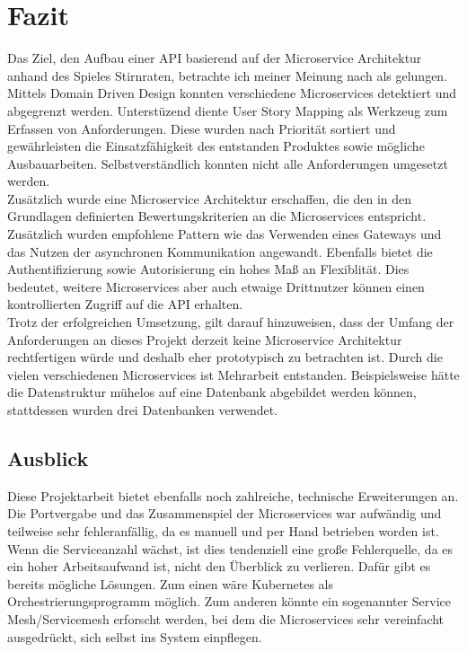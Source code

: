 \section{Fazit}

Das Ziel, den Aufbau einer API basierend auf der Microservice Architektur anhand des Spieles Stirnraten, betrachte ich meiner Meinung nach als gelungen. Mittels Domain Driven Design konnten verschiedene Microservices detektiert und abgegrenzt werden. Unterstüzend diente User Story Mapping als Werkzeug zum Erfassen von Anforderungen. Diese wurden nach Priorität sortiert und gewährleisten die Einsatzfähigkeit des entstanden Produktes sowie mögliche Ausbauarbeiten. Selbstverständlich konnten nicht alle Anforderungen umgesetzt werden. \\

Zusätzlich wurde eine Microservice Architektur erschaffen, die den in den Grundlagen definierten Bewertungskriterien an die Microservices entspricht. Zusätzlich wurden empfohlene Pattern wie das Verwenden eines Gateways und das Nutzen der asynchronen Kommunikation angewandt. Ebenfalls bietet die Authentifizierung sowie Autorisierung ein hohes Maß an Flexiblität. Dies bedeutet, weitere Microservices aber auch etwaige Drittnutzer können einen kontrollierten Zugriff auf die API erhalten.\\

Trotz der erfolgreichen Umsetzung, gilt darauf hinzuweisen, dass der Umfang der Anforderungen an dieses Projekt derzeit keine Microservice Architektur rechtfertigen würde und deshalb eher prototypisch zu betrachten ist. Durch die vielen verschiedenen Microservices ist Mehrarbeit entstanden. Beispielsweise hätte die Datenstruktur mühelos auf eine Datenbank abgebildet werden können, stattdessen wurden drei Datenbanken verwendet. 

\subsection{Ausblick}
Diese Projektarbeit bietet ebenfalls noch zahlreiche, technische Erweiterungen an. Die Portvergabe und das Zusammenspiel der Microservices war aufwändig und teilweise sehr fehleranfällig, da es manuell und per Hand betrieben worden ist. Wenn die Serviceanzahl wächst, ist dies tendenziell eine große Fehlerquelle, da es ein hoher Arbeitsaufwand ist, nicht den Überblick zu verlieren. Dafür gibt es bereits mögliche Lösungen. Zum einen wäre Kubernetes als Orchestrierungsprogramm möglich. Zum anderen könnte ein sogenannter Service Mesh/Servicemesh erforscht werden, bei dem die Microservices sehr vereinfacht ausgedrückt, sich selbst ins System einpflegen. \\

